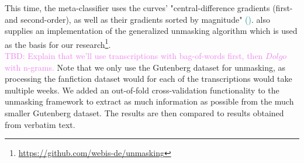 This time, the meta-classifier uses the curves' "central-difference gradients (first- and second-order), as well as their gradients sorted by magnitude" \textcolor{teal}{(\cite{bevendorff2019unmaskingShortTexts})}.
\cite{bevendorff2019unmaskingShortTexts} also supplies an implementation of the generalized unmasking algorithm which is used as the basis for our research\footnote{\url{https://github.com/webis-de/unmasking}}.\\
\textcolor{violet}{TBD: Explain that we'll use transcriptions with bag-of-words first, then $Dolgo$ with n-grams.}
Note that we only use the Gutenberg dataset for unmasking, as processing the fanfiction dataset would for each of the transcriptions would take multiple weeks.
We added an out-of-fold cross-validation functionality to the unmasking framework to extract as much information as possible from the much smaller Gutenberg dataset.
The results are then compared to results obtained from verbatim text.




%
%


